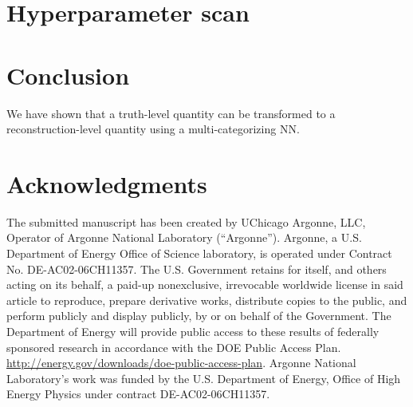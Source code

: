 \documentclass[showpacs,showkeys,preprint,prd,nofootinbib,linenumbers,12pt]{revtex4-1}
\begin{document}
\section{Hyperparameter scan}


\section{Conclusion}
We have shown that a truth-level quantity can be transformed to a reconstruction-level quantity using a multi-categorizing NN. 

\section*{Acknowledgments}
The submitted manuscript has been created by UChicago Argonne, LLC, Operator of Argonne National Laboratory (“Argonne”). Argonne, a U.S.  Department of Energy Office of Science laboratory, is operated under Contract No. DE-AC02-06CH11357. The U.S. Government retains for itself, 
and others acting on its behalf, a paid-up nonexclusive, irrevocable worldwide license in said article to reproduce, prepare derivative works, distribute copies to the public, and perform publicly and display publicly, by or on behalf of the Government.  The Department of Energy will provide public access to these results of federally sponsored research in accordance with the 
DOE Public Access Plan. \url{http://energy.gov/downloads/doe-public-access-plan}. Argonne National Laboratory’s work was funded by the U.S. Department of Energy, Office of High Energy Physics under contract DE-AC02-06CH11357. 



\end{document}
